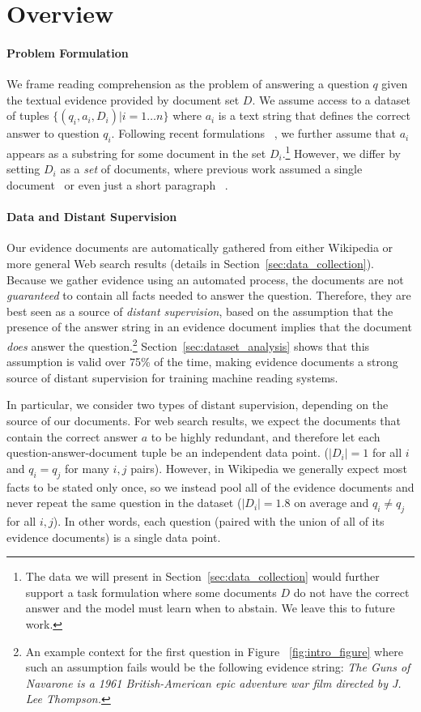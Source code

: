 \section{Overview}
\label{sec:formulation}

\paragraph{Problem Formulation} We frame reading comprehension as the problem of answering a question $q$ given the textual evidence provided by document set $D$. We assume access to a dataset of tuples $\{(q_i,a_i,D_i) | i=1 \ldots n\}$ where $a_i$ is a text string that defines the correct answer to question $q_i$. Following recent formulations \mbox{~\cite{Rajpurkar:16}}, we further assume that $a_i$ appears as a substring for some document in the set $D_i$.\footnote{The data we will present in Section~\ref{sec:data_collection} would further support a task formulation where some documents $D$ do not have the correct answer and the model must learn when to abstain. We leave this to future work.} However, we differ by setting $D_i$ as a {\em set} of documents, where previous work assumed a single document~\cite{Hermann:15} or even just a short paragraph \mbox{~\cite{Rajpurkar:16}}. 

\paragraph{Data and Distant Supervision} Our evidence documents are automatically gathered from either Wikipedia or more general Web search results (details in Section~\ref{sec:data_collection}).  Because we gather evidence using an automated process, the documents are not {\em guaranteed} to contain all facts needed to answer the question. Therefore, they are best seen as a source of {\em distant supervision}, based on the assumption that the presence of the answer string in an evidence document implies that the document {\em does} answer the question.\footnote{An example context for the first question in Figure ~\ref{fig:intro_figure} where such an assumption fails would be the following evidence string: \emph{The Guns of Navarone is a 1961 British-American epic adventure war film directed by J. Lee Thompson.}} Section~\ref{sec:dataset_analysis} shows that this assumption is valid over 75\% of the time, making evidence documents  a strong source of distant supervision for training machine reading systems.

In particular, we consider two types of distant supervision, depending on the source of our documents. For web search results, we expect the documents that contain the correct answer $a$ to be highly redundant, and therefore let each question-answer-document tuple be an independent data point. ($|D_i|=1$ for all $i$ and $q_i=q_j$ for many $i,j$ pairs). However, in Wikipedia we generally expect most facts to  be stated only once, so we instead pool all of the evidence documents and never repeat the same question in the dataset ($|D_i|=1.8$ on average and $q_i\neq q_j$ for all $i,j$). In other words, each question (paired with the union of all of its evidence documents) is a single data point. 

